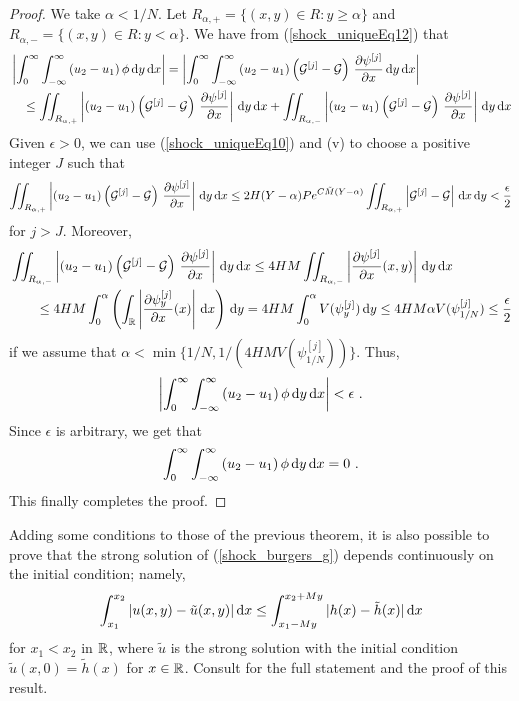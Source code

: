 \begin{proof}
We take $\alpha < 1/N$.  Let
$R_{\alpha,+} = \{ (x,y) \in R : y \geq \alpha \}$ and
$R_{\alpha,-} = \{ (x,y) \in R : y < \alpha \}$.  We have from
(\ref{shock_uniqueEq12}) that
\begin{align*}
&\left| \int_0^\infty \int_{-\infty}^\infty
\left(u_2 - u_1 \right) \phi \,\mathrm{d}{y} \,\mathrm{d}{x} \right|
= \left|\int_0^\infty \int_{-\infty}^\infty
\left(u_2 - u_1 \right)\left({\cal G}^{[j]} - {\cal G}\right)
\,\frac{\partial{\psi^{[j]}}}{\partial x} \,\mathrm{d}{y} \,\mathrm{d}{x} \right| \\
&\quad \leq \iint_{R_{\alpha,+}} \left|
\left(u_2 - u_1 \right)\left({\cal G}^{[j]} - {\cal G}\right)
\,\frac{\partial{\psi^{[j]}}}{\partial x} \right| \,\mathrm{d}{y} \,\mathrm{d}{x}
+ \iint_{R_{\alpha,-}} \left|
\left(u_2 - u_1 \right)\left({\cal G}^{[j]} - {\cal G}\right)
\,\frac{\partial{\psi^{[j]}}}{\partial x} \right|\,\mathrm{d}{y} \,\mathrm{d}{x}
\end{align*}
Given $\epsilon>0$, we can use (\ref{shock_uniqueEq10}) and (v) to
choose a positive integer $J$ such that
\[
\iint_{R_{\alpha,+}} \left|
\left(u_2 - u_1 \right)\left({\cal G}^{[j]} - {\cal G}\right)
\,\frac{\partial{\psi^{[j]}}}{\partial x} \right| \,\mathrm{d}{y} \,\mathrm{d}{x}
\leq 2 H (Y-\alpha) P e^{C\tilde{M}(Y-\alpha)}
\iint_{R_{\alpha,+}} \left|{\cal G}^{[j]} - {\cal G}\right| \,\mathrm{d}{x}\,\mathrm{d}{y}
< \frac{\epsilon}{2}
\]
for $j >J$.  Moreover,
\begin{align*}
&\iint_{R_{\alpha,-}} \left|
\left(u_2 - u_1 \right)\left({\cal G}^{[j]} - {\cal G}\right)
\,\frac{\partial{\psi^{[j]}}}{\partial x} \right|\,\mathrm{d}{y} \,\mathrm{d}{x}
\leq 4 H M \iint_{R_{\alpha,-}} \left|\frac{\partial{\psi^{[j]}}}{\partial x}(x,y)
\right|\,\mathrm{d}{y} \,\mathrm{d}{x} \\
&\qquad \leq 4 H M \int_0^\alpha \left(\int_{\mathbb{R}} \left|\frac{\partial{\psi^{[j]}_y}}{\partial x}(x)
\right|\,\mathrm{d}{x} \right)\,\mathrm{d}{y}
= 4 H M \int_0^\alpha V(\psi^{[j]}_y) \,\mathrm{d}{y}
\leq 4 H M \alpha V(\psi^{[j]}_{1/N}) \leq \frac{\epsilon}{2}
\end{align*}
if we assume that
$\displaystyle \alpha < \min \{1/N, 1/(4 H M V(\psi^{[j]}_{1/N})) \}$.
Thus,
\[
\left| \int_0^\infty \int_{-\infty}^\infty
\left(u_2 - u_1 \right) \phi \dx{y} \dx{x} \right| < \epsilon \ .
\]
Since $\epsilon$ is arbitrary, we get that
\[
\int_0^\infty \int_{-\infty}^\infty
\left(u_2 - u_1 \right) \phi \,\mathrm{d}{y} \,\mathrm{d}{x} = 0 \ .
\]
This finally completes the proof.
\end{proof}

Adding some conditions to those of the previous theorem, it is also
possible to prove that the strong solution of (\ref{shock_burgers_g}) 
depends continuously on the initial condition; namely,
\[
\int_{x_1}^{x_2} |u(x,y) - \tilde{u}(x,y)|\,\mathrm{d}{x} 
\leq \int_{x_1-My}^{x_2+My} |h(x) - \tilde{h}(x)|\,\mathrm{d}{x}
\]
for $x_1 < x_2$ in $\mathbb{R}$, where $\tilde{u}$ is the strong solution
with the initial condition $\tilde{u}(x,0) = \tilde{h}(x)$ for $x\in \mathbb{R}$.
Consult \cite{Smo} for the full statement and the proof of this
result.

